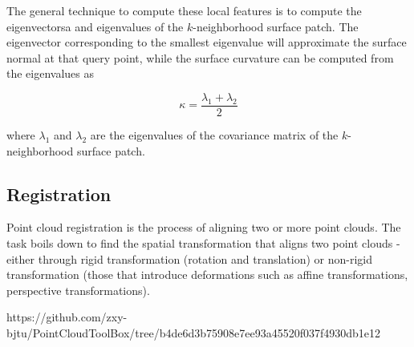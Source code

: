 \documentclass[a4paper, 11pt, twocolumn]{article}
\begin{document}
The general technique to compute these local features is to compute the eigenvectorsa and eigenvalues of the $k$-neighborhood surface patch. The eigenvector corresponding to the smallest eigenvalue will approximate the surface normal at that query point, while the surface curvature can be computed from the eigenvalues as

$$
\kappa = \frac{\lambda_1 + \lambda_2}{2}
$$

where $\lambda_1$ and $\lambda_2$ are the eigenvalues of the covariance matrix of the $k$-neighborhood surface patch.

\subsection{Registration}
Point cloud registration is the process of aligning two or more point clouds. The task boils down to find the spatial transformation that aligns two point clouds - either through rigid transformation (rotation and translation) or non-rigid transformation (those that introduce deformations such as affine transformations, perspective transformations).

https://github.com/zxy-bjtu/PointCloudToolBox/tree/b4de6d3b75908e7ee93a45520f037f4930db1e12 

\nocite{*}
 

\end{document}

